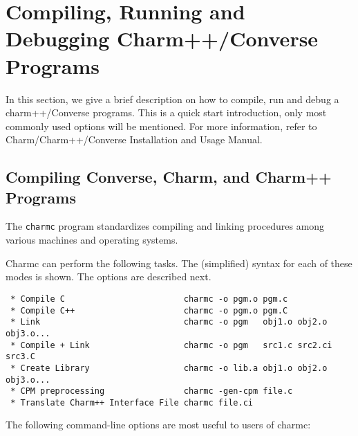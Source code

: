 \section{Compiling, Running and Debugging Charm++/Converse Programs}

 In this section, we give a brief description on how to compile, run and debug a charm++/Converse programs. This is a quick start introduction, only most commonly used options will be mentioned. For more information, refer to Charm/Charm++/Converse Installation and Usage Manual.

\subsection{Compiling Converse, Charm, and Charm++ Programs}

The {\tt charmc} program standardizes compiling and linking procedures
among various machines and operating systems.  

Charmc can perform the following tasks.  The (simplified) syntax for
each of these modes is shown. The options are described next.

\begin{verbatim}
 * Compile C                        charmc -o pgm.o pgm.c
 * Compile C++                      charmc -o pgm.o pgm.C
 * Link                             charmc -o pgm   obj1.o obj2.o obj3.o...
 * Compile + Link                   charmc -o pgm   src1.c src2.ci src3.C
 * Create Library                   charmc -o lib.a obj1.o obj2.o obj3.o...
 * CPM preprocessing                charmc -gen-cpm file.c
 * Translate Charm++ Interface File charmc file.ci
\end{verbatim}

The following command-line options are most useful to users of charmc:

